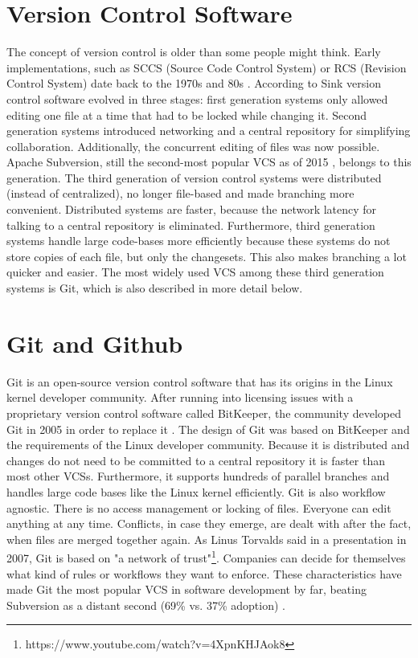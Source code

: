 \section{Version Control Software}
The concept of version control is older than some people might think. Early implementations, such as SCCS (Source Code Control System) or RCS (Revision Control System) date back to the 1970s and 80s \cite{rochkind_source_1975}. According to Sink \cite{sink_version_2011} version control software evolved in three stages: first generation systems only allowed editing one file at a time that had to be locked while changing it. Second generation systems introduced networking and a central repository for simplifying collaboration. Additionally, the concurrent editing of files was now possible. Apache Subversion, still the second-most popular VCS as of 2015 \cite{_stack_2015}, belongs to this generation. The third generation of version control systems were distributed (instead of centralized), no longer file-based and made branching more convenient. Distributed systems are faster, because the network latency for talking to a central repository is eliminated. Furthermore, third generation systems handle large code-bases more efficiently because these systems do not store copies of each file, but only the changesets. This also makes branching a lot quicker and easier. The most widely used VCS among these third generation systems is Git, which is also described in more detail below.

\section{Git and Github}
Git is an open-source version control software that has its origins in the Linux kernel developer community. After running into licensing issues with a proprietary version control software called BitKeeper, the community developed Git in 2005 in order to replace it \cite{chacon_pro_2009, ruparelia_history_2010}. The design of Git was based on BitKeeper and the requirements of the Linux developer community. Because it is distributed and changes do not need to be committed to a central repository it is faster than most other VCSs. Furthermore, it supports hundreds of parallel branches and handles large code bases like the Linux kernel efficiently. Git is also workflow agnostic. There is no access management or locking of files. Everyone can edit anything at any time. Conflicts, in case they emerge, are dealt with after the fact, when files are merged together again. As Linus Torvalds said in a presentation in 2007, Git is based on "a network of trust"\footnote{https://www.youtube.com/watch?v=4XpnKHJAok8}. Companies can decide for themselves what kind of rules or workflows they want to enforce. These characteristics have made Git the most popular VCS in software development by far, beating Subversion as a distant second (69\% vs. 37\% adoption) \cite{_stack_2015}.

